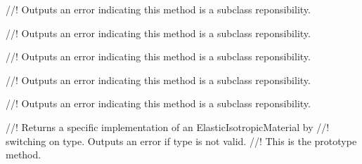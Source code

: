 //! Outputs an error indicating this method is a subclass reponsibility.

//! Outputs an error indicating this method is a subclass reponsibility.

//! Outputs an error indicating this method is a subclass reponsibility.

//! Outputs an error indicating this method is a subclass reponsibility.

//! Outputs an error indicating this method is a subclass reponsibility.

//! Returns a specific implementation of an ElasticIsotropicMaterial by
//! switching on \p type.  Outputs an error if \p type is not valid.
//! This is the prototype method.
